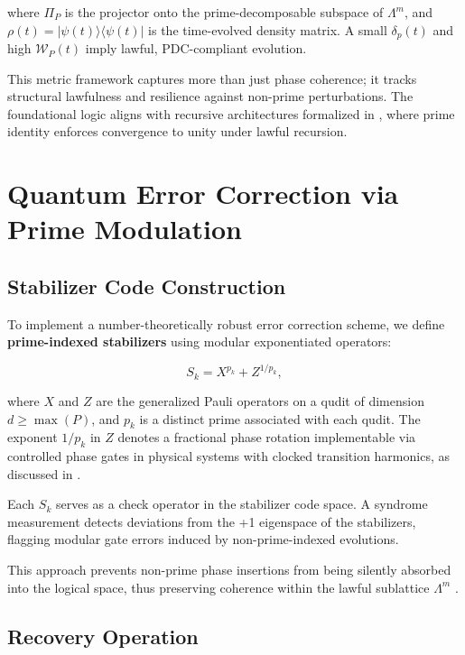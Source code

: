 \documentclass[12]{amsart}
\theoremstyle{plain}
\begin{document}
where $\Pi_P$ is the projector onto the prime-decomposable subspace of $\Lambda^m$, and $\rho(t) = |\psi(t)\rangle \langle \psi(t)|$ is the time-evolved density matrix. A small $\delta_p(t)$ and high $\mathcal{W}_P(t)$ imply lawful, PDC-compliant evolution.

This metric framework captures more than just phase coherence; it tracks structural lawfulness and resilience against non-prime perturbations. The foundational logic aligns with recursive architectures formalized in \cite{total_unity}, where prime identity enforces convergence to unity under lawful recursion.

\section{Quantum Error Correction via Prime Modulation}

\subsection{Stabilizer Code Construction}

To implement a number-theoretically robust error correction scheme, we define \textbf{prime-indexed stabilizers} using modular exponentiated operators:

\begin{equation}
S_k = X^{p_k} + Z^{1/p_k},
\end{equation}

where $X$ and $Z$ are the generalized Pauli operators on a qudit of dimension $d \geq \max(P)$, and $p_k$ is a distinct prime associated with each qudit. The exponent $1/p_k$ in $Z$ denotes a fractional phase rotation implementable via controlled phase gates in physical systems with clocked transition harmonics, as discussed in \cite{advancements}.

Each $S_k$ serves as a check operator in the stabilizer code space. A syndrome measurement detects deviations from the +1 eigenspace of the stabilizers, flagging modular gate errors induced by non-prime-indexed evolutions.

This approach prevents non-prime phase insertions from being silently absorbed into the logical space, thus preserving coherence within the lawful sublattice $\Lambda^m$ \cite{meta_theorem_prime}.

\subsection{Recovery Operation}
\end{document}
